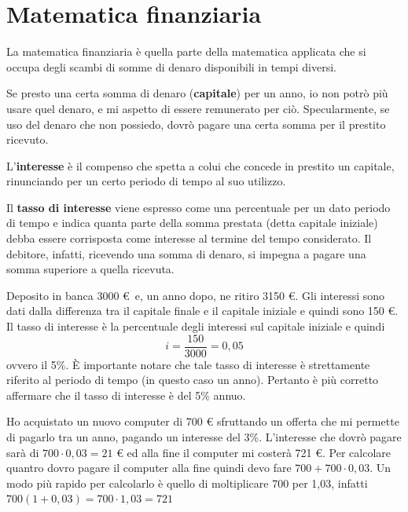 
\chapter{Matematica finanziaria}

La matematica finanziaria è quella parte della matematica applicata che si 
occupa degli scambi di somme di denaro disponibili in tempi diversi.

Se presto una certa somma di denaro (\textbf{capitale}) per un anno, io non 
potrò più usare quel denaro, e mi aspetto di essere remunerato per ciò. 
Specularmente, se uso del denaro che non possiedo, dovrò pagare una certa 
somma per il prestito ricevuto. 

L'\textbf{interesse} è il compenso che spetta a colui che concede in 
prestito un capitale, rinunciando per un certo periodo di tempo al suo 
utilizzo. 

Il \textbf{tasso di interesse} viene espresso come una percentuale per un 
dato periodo di tempo e indica quanta parte della somma prestata (detta 
capitale iniziale) debba essere corrisposta come interesse al termine del 
tempo considerato. Il debitore, infatti, ricevendo una 
somma di denaro, si impegna a pagare una somma superiore a quella ricevuta. 

\begin{exrig}
\begin{esempio}
Deposito in banca 3000 € \,e, un anno dopo, ne ritiro 3150 €. Gli interessi 
sono dati dalla differenza tra il capitale finale e il capitale iniziale e 
quindi sono 150 €. Il tasso di interesse è la percentuale degli interessi 
sul capitale iniziale e quindi
\[ i = \dfrac{150}{3000} = 0,05 \]
ovvero il 5\%. \`{E} importante notare che tale tasso di interesse è 
strettamente riferito al periodo di tempo (in questo caso un anno). 
Pertanto è più corretto affermare che il tasso di interesse è del 5\% 
annuo. 
\end{esempio}

\begin{esempio}
Ho acquistato un nuovo computer di 700 € sfruttando un offerta che mi 
permette di pagarlo tra un anno, pagando un interesse del 3\%.
L'interesse che dovrò pagare sarà di \(700 \cdot 0,03 = 21\) € ed alla fine 
il computer mi costerà 721 €. Per calcolare quantro dovro pagare il 
computer alla fine quindi devo fare \(700+700\cdot0,03\). Un modo più rapido 
per calcolarlo è quello di moltiplicare 700 per 1,03, infatti 
\(700(1+0,03)=700\cdot1,03=721\)
\end{esempio}

\end{exrig}

